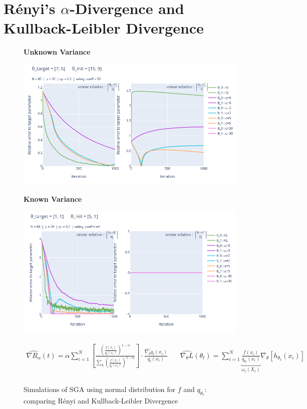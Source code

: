 \section{Rényi's $\alpha$-Divergence and Kullback-Leibler Divergence}

\begin{figure}[H]
    \centering

    \textbf{Unknown Variance}
    
    \includegraphics[height=0.32\pdfpageheight]{Images/simulation/normal_case/KL_and_Renyi_unkown_variance.png}

    \textbf{Known Variance}
    
    \includegraphics[height=0.32\pdfpageheight]{Images/simulation/normal_case/KL_and_Renyi_kown_variance.png}

    
    \begin{align*}
    \widehat{\nabla R_\alpha}(t) = \displaystyle{ \alpha  \sum\limits_{i=1}^N  \left[\frac{\left( \frac{f(x_i)}{q_t(x_i)} \right)^{1-\alpha}}{\sum\limits_k \left(\frac{f(x_i)}{q_t(x_i)}\right)^{1-\alpha}}\right] \cdot \frac{\widehat{\nabla_\theta} {q_t}(x_i)}{q_t(x_i)}} 
    & \, &
    \widehat{\nabla_\theta L}(\theta_t) = \displaystyle\sum\limits_{i=1}^{N} \underbracket{\displaystyle\frac{f(x_i)}{q_{\theta_t}(x_i)}}_{\omega_t(X_i)} \nabla_\theta \left[ h_{\theta_t}(x_i)\right] \\
    & \, &
    \end{align*}
    
    
    \caption{Simulations of SGA using normal distribution for $f$ and $q_{\theta_t}$: comparing Rényi and Kullback-Leibler Divergence}
    \label{sim:KL-and-R}
\end{figure}

